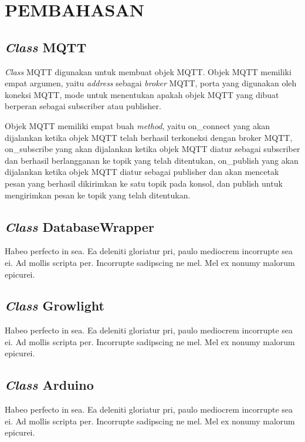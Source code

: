 
\chapter{PEMBAHASAN}

\section{\textit{Class} MQTT}
\textit{Class} MQTT digunakan untuk membuat objek MQTT. Objek MQTT memiliki empat argumen, yaitu \textit{address} sebagai \textit{broker} MQTT, porta yang digunakan oleh koneksi MQTT, mode untuk menentukan apakah objek MQTT yang dibuat berperan sebagai subscriber atau publisher.

Objek MQTT memiliki empat buah \textit{method}, yaitu on\_connect yang akan dijalankan ketika objek MQTT telah berhasil terkoneksi dengan broker MQTT, on\_subscribe yang akan dijalankan ketika objek MQTT diatur sebagai subscriber dan berhasil berlangganan ke topik yang telah ditentukan, on\_publish yang akan dijalankan ketika objek MQTT diatur sebagai publisher dan akan mencetak pesan yang berhasil dikirimkan ke satu topik pada konsol, dan publish untuk mengirimkan pesan ke topik yang telah ditentukan.

\section{\textit{Class} DatabaseWrapper}
Habeo perfecto in sea. Ea deleniti gloriatur pri, paulo mediocrem incorrupte sea ei. Ad mollis scripta per. Incorrupte sadipscing ne mel. Mel ex nonumy malorum epicurei.

\section{\textit{Class} Growlight}
Habeo perfecto in sea. Ea deleniti gloriatur pri, paulo mediocrem incorrupte sea ei. Ad mollis scripta per. Incorrupte sadipscing ne mel. Mel ex nonumy malorum epicurei.

\section{\textit{Class} Arduino}
Habeo perfecto in sea. Ea deleniti gloriatur pri, paulo mediocrem incorrupte sea ei. Ad mollis scripta per. Incorrupte sadipscing ne mel. Mel ex nonumy malorum epicurei.
			
\begin{comment}

\end{comment}
